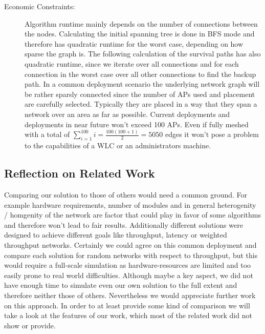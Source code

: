 \begin{description}
	\item[Economic Constraints:]
	  Algorithm runtime mainly depends on the number of connections between the nodes.
	  Calculating the initial spanning tree is done in \ac{BFS} mode and therefore has quadratic runtime for the worst case, depending on how sparse the graph is.
	  The following calculation of the survival paths has also quadratic runtime,
	  since we iterate over all connections and for each connection in the worst case over all other connections to find the backup path.
	  In a common deployment scenario the underlying network graph will be rather sparsly connected since the number of APs used and placement are carefully selected.
	  Typically they are placed in a way that they span a network over an area as far as possible.
	  Current deployments and deployments in near future won't exceed 100 APs. 
	  Even if fully meshed with a total of \(\sum \limits_{i=1}^{100} i = \frac{100(100+1)}{2}=5050\)
	  edges it won't pose a problem to the capabilities of a \ac{WLC} or an administrators machine.
	  
      \end{description}
      
\newpage
      
    \subsection{Reflection on Related Work}
      Comparing our solution to those of others would need a common ground. 
      For example hardware requirements, number of modules and in general heterogenity / homgenity of
      the network are factor that could play in favor of some algorithms and therefore won't lead to fair results. 
      Additionally different solutions were designed to achieve different goals like throughput, latency or weighted throughput networks. 
      Certainly we could agree on this common deployment and compare each solution for random networks with respect to throughput, 
      but this would require a full-scale simulation as hardware-resources are limited and too easily prone to real world difficulties.
      Although maybe a key aspect, we did not have enough time to simulate even our own solution to the full extent and therefore neither those of others. 
      Nevertheless we would appreciate further work on this approach. 
      In order to at least provide some kind of comparison we will take a look at the features of our work, which most of the related work did not show or provide.
      
